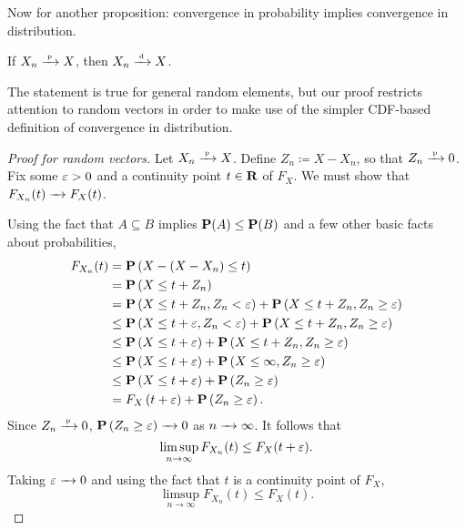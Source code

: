 \documentclass[11pt,letterpaper,reqno,oneside]{article}
\begin{document}
Now for another proposition: convergence in probability implies convergence in distribution.

\begin{proposition}
	\label{proposition:convp_convd}
	If $X_n \xrightarrow{{\scriptscriptstyle \mathrm{\;p\;}}} X$, then $X_n \xrightarrow{{\scriptscriptstyle \mathrm{\;d\;}}} X$.
\end{proposition}


The statement is true for general random elements, but our proof restricts attention to random vectors in order to make use of the simpler CDF-based definition of convergence in distribution.


\begin{proof}[Proof for random vectors]
	Let $X_n \xrightarrow{{\scriptscriptstyle \mathrm{\;p\;}}} X$. Define $Z_n \coloneqq X - X_n$, so that $Z_n \xrightarrow{{\scriptscriptstyle \mathrm{\;p\;}}} 0$. Fix some $\varepsilon>0$ and a continuity point $t \in \mathbf{R}$ of $F_X$. We must show that $F_{X_n}(t) \xrightarrow{\;\;\;} F_X(t)$.

	Using the fact that $A \subseteq B$ implies $\mathbf{P}(A) \leq \mathbf{P}(B)$ and a few other basic facts about probabilities,
	\begin{align*}
		F_{X_n}(t)
		={}& \mathbf{P}\left( X - ( X - X_n) \leq t \right) \\
		={}& \mathbf{P}\left( X \leq t + Z_n \right) \\
		={}& \mathbf{P}\left( X \leq t + Z_n, Z_n < \varepsilon \right)
		+ \mathbf{P}\left( X \leq t + Z_n, Z_n \geq \varepsilon \right) \\
		\leq{}& \mathbf{P}\left( X \leq t + \varepsilon, Z_n < \varepsilon \right)
		+ \mathbf{P}\left( X \leq t + Z_n, Z_n \geq \varepsilon \right) \\
		\leq{}& \mathbf{P}\left( X \leq t + \varepsilon \right)
		+ \mathbf{P}\left( X \leq t + Z_n, Z_n \geq \varepsilon \right) \\
		\leq{}& \mathbf{P}\left( X \leq t + \varepsilon \right)
		+ \mathbf{P}\left( X \leq \infty, Z_n \geq \varepsilon \right) \\
		\leq{}& \mathbf{P}\left( X \leq t + \varepsilon \right)
		+ \mathbf{P}\left( Z_n \geq \varepsilon \right) \\
		={}& F_{X}\left( t + \varepsilon \right)
		+ \mathbf{P}\left( Z_n \geq \varepsilon \right) .
	\end{align*}
	Since $Z_n \xrightarrow{{\scriptscriptstyle \mathrm{\;p\;}}} 0$, $\mathbf{P}\left( Z_n \geq \varepsilon \right) \xrightarrow{\;\;\;} 0$ as $n \xrightarrow{\;\;\;} \infty$. It follows that
	\begin{equation*}
		\limsup_{n\to\infty} F_{X_n}(t) \leq F_X(t+\varepsilon) .
	\end{equation*}
	Taking $\varepsilon\xrightarrow{\;\;\;} 0$ and using the fact that $t$ is a continuity point of $F_X$,
	\begin{equation*}
		\limsup_{n\to\infty} F_{X_n}(t) \leq F_X(t) .
	\end{equation*}
	

\end{proof}
\end{document}
